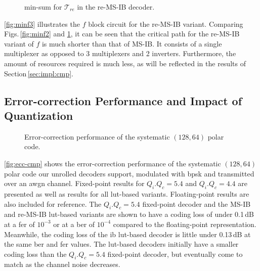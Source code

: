 \documentclass[conference,letterpaper]{IEEEtran}
\begin{document}
\begin{figure}[t]
  \centering
  \resizebox{0.6\columnwidth}{!}{}
  \caption{min-sum for $\mathcal{T}_{re}$ in the re-MS-IB decoder.}
  \label{fig:minf3}
\end{figure}

\autoref{fig:minf3} illustrates the $f$ block circuit for the re-MS-IB variant. Comparing Figs.\,\ref{fig:minf2} and \ref{fig:minf3}, it can be seen that the critical path for the re-MS-IB variant of $f$ is much shorter than that of MS-IB. It consists of a single multiplexer as opposed to 3 multiplexers and 2 inverters. Furthermore, the amount of resources required is much less, as will be reflected in the results of Section\,\ref{sec:impl:cmp}.


\subsection{Error-correction Performance and Impact of Quantization}\label{sec:impl:ec-perf}
\begin{figure}
  \centering
  
  \caption{Error-correction performance of the systematic $(128, 64)$ polar code.}
  \label{fig:ecc-cmp}
\end{figure}

\autoref{fig:ecc-cmp} shows the error-correction performance of the systematic $(128, 64)$ polar code our unrolled decoders support, modulated with \gls{bpsk} and transmitted over an \gls{awgn} channel.
Fixed-point results for $Q_i$.$Q_c=5.4$ and $Q_i$.$Q_c=4.4$ are presented as well as results for all \gls{lut}-based variants.
Floating-point results are also included for reference.
The $Q_i$.$Q_c=5.4$ fixed-point decoder and the MS-IB and re-MS-IB \gls{lut}-based variants are shown to have a coding loss of under 0.1\,dB at a \gls{fer} of $10^{-3}$ or at a \gls{ber} of $10^{-4}$ compared to the floating-point representation.
Meanwhile, the coding loss of the \gls{ib} \gls{lut}-based decoder is little under 0.13\,dB at the same \gls{ber} and \gls{fer} values. The \gls{lut}-based decoders initially have a smaller coding loss than the $Q_i$.$Q_c=5.4$ fixed-point decoder, but eventually come to match as the channel noise decreases.
\end{document}
